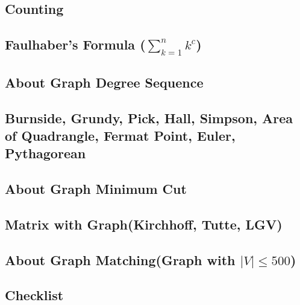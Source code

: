\documentclass[landscape, 8pt, a4paper, oneside]{extarticle}
\begin{document}
\begin{multicols*}{3}
\subsection{Counting}


\subsection{Faulhaber's Formula ($\sum_{k=1}^{n} k^c$)}


\subsection{About Graph Degree Sequence}


\subsection{Burnside, Grundy, Pick, Hall, Simpson, Area of Quadrangle, Fermat Point, Euler, Pythagorean}


\subsection{About Graph Minimum Cut}


\subsection{Matrix with Graph(Kirchhoff, Tutte, LGV)}


\subsection{About Graph Matching(Graph with $\vert V \vert \leq 500$)}


\subsection{Checklist}


\end{multicols*}
\end{document}
